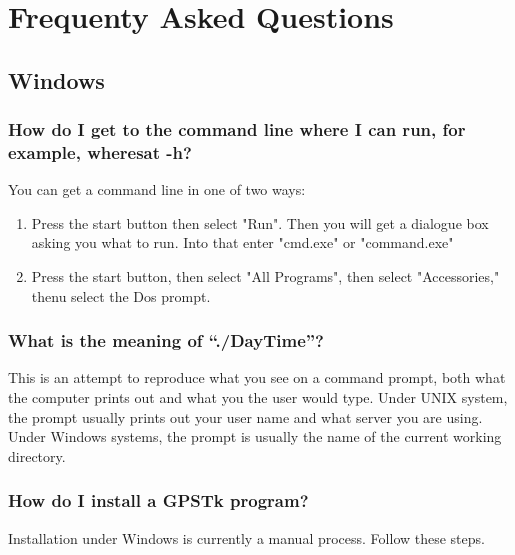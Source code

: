 \chapter{Frequenty Asked Questions}


\section{Windows}

\subsection{How do I get to the command line where I can run, for example, wheresat -h?}

You can get a command line in one of two ways:

\begin{enumerate}
\item Press the start button then select "Run". Then you will get a dialogue box asking you what to run. Into that enter "cmd.exe" or "command.exe"

\item Press the start button, then select "All Programs", then select "Accessories," thenu select the Dos prompt.
\end{enumerate}

\subsection{What is the meaning of ``./DayTime''?}

This is an attempt to reproduce what you see on a command prompt, both what the computer prints out and what you the user would type. Under UNIX system, the prompt usually prints out your user name and what server you are using. Under Windows systems, the prompt is usually the name of the current working directory.

\subsection{How do I install a GPSTk program?}

Installation under Windows is currently a manual process. Follow these steps.

